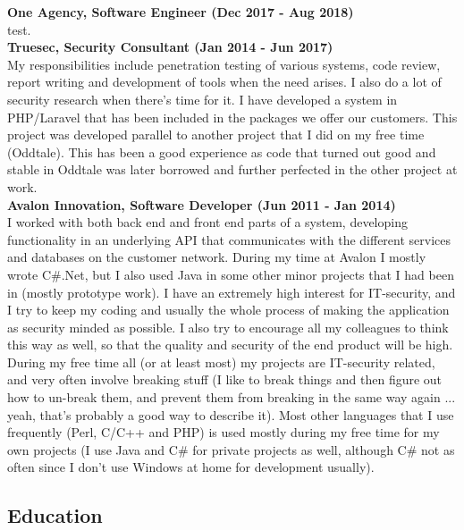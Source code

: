 \documentclass[12pt,a4paper,oneside]{article}
\begin{document}
\textbf{One Agency, Software Engineer (Dec 2017 - Aug 2018)} \\
test. \\

\textbf{Truesec, Security Consultant (Jan 2014 - Jun 2017)} \\
My responsibilities include penetration testing of various systems, code review, report writing and development of tools when the need arises. I also do a lot of security research when there's time for it. I have developed a system in PHP/Laravel that has been included in the packages we offer our customers. This project was developed parallel to another project that I did on my free time (Oddtale). This has been a good experience as code that turned out good and stable in Oddtale was later borrowed and further perfected in the other project at work. \\

\textbf{Avalon Innovation, Software Developer (Jun 2011 - Jan 2014)} \\
I worked with both back end and front end parts of a system, developing functionality in an underlying API that communicates with the different services and databases on the customer network. During my time at Avalon I mostly wrote C\#.Net, but I also used Java in some other minor projects that I had been in (mostly prototype work). I have an extremely high interest for IT-security, and I try to keep my coding and usually the whole process of making the application as security minded as possible. I also try to encourage all my colleagues to think this way as well, so that the quality and security of the end product will be high. During my free time all (or at least most) my projects are IT-security related, and very often involve breaking stuff (I like to break things and then figure out how to un-break them, and prevent them from breaking in the same way again ... yeah, that's probably a good way to describe it). Most other languages that I use frequently (Perl, C/C++ and PHP) is used mostly during my free time for my own projects (I use Java and C\# for private projects as well, although C\# not as often since I don't use Windows at home for development usually). \\

\newpage

\subsection*{Education}
\end{document}
